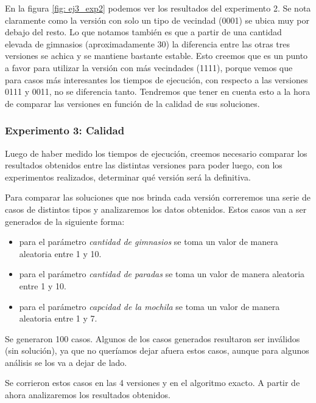 \par En la figura \ref{fig: ej3_exp2} podemos ver los resultados del experimento 2. Se nota claramente como la versión con solo un tipo de vecindad (0001) se ubica muy por debajo del resto. Lo que notamos también es que a partir de una cantidad elevada de gimnasios (aproximadamente 30) la diferencia entre las otras tres versiones se achica y se mantiene bastante estable. Esto creemos que es un punto a favor para utilizar la versión con más vecindades (1111), porque vemos que para casos más interesantes los tiempos de ejecución, con respecto a las versiones 0111 y 0011, no se diferencia tanto. Tendremos que tener en cuenta esto a la hora de comparar las versiones en función de la calidad de sus soluciones.



\subsubsection{Experimento 3: Calidad}

\par Luego de haber medido los tiempos de ejecución, creemos necesario comparar los resultados obtenidos entre las distintas versiones para poder luego, con los experimentos realizados, determinar qué versión será la definitiva.

\par Para comparar las soluciones que nos brinda cada versión correremos una serie de casos de distintos tipos y analizaremos los datos obtenidos. Estos casos van a ser generados de la siguiente forma:

\begin{itemize}
  \item para el parámetro \textit{cantidad de gimnasios} se toma un valor de manera aleatoria entre 1 y 10.
  \item para el parámetro \textit{cantidad de paradas} se toma un valor de manera aleatoria entre 1 y 10.
  \item para el parámetro \textit{capcidad de la mochila} se toma un valor de manera aleatoria entre 1 y 7.
\end{itemize}

\par Se generaron 100 casos. Algunos de los casos generados resultaron ser inválidos (sin solución), ya que no queríamos dejar afuera estos casos, aunque para algunos análisis se los va a dejar de lado.

\par Se corrieron estos casos en las 4 versiones y en el algoritmo exacto. A partir de ahora analizaremos los resultados obtenidos.

